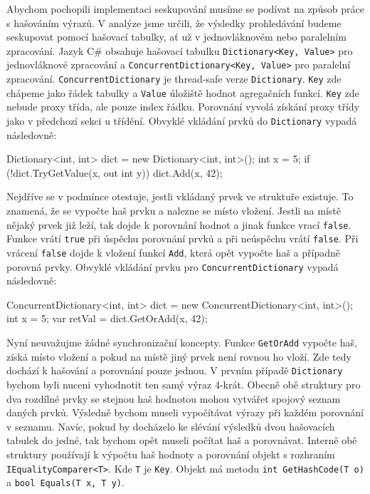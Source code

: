 Abychom pochopili implementaci seskupování musíme se podívat na způsob práce s hašováním výrazů.
V analýze jsme určili, že výsledky prohledávání budeme seskupovat pomocí hašovací tabulky, ať už v jednovláknovém nebo paralelním zpracování.
Jazyk C\# obsahuje hašovací tabulku \texttt{Dictionary<Key, Value>} pro jednovláknové zpracování a \texttt{ConcurrentDictionary<Key, Value>} pro paralelní zpracování.
\texttt{ConcurrentDictionary} je thread-safe verze \texttt{Dictionary}. 
\texttt{Key} zde chápeme jako řádek tabulky a \texttt{Value} úložiště hodnot agregačních funkcí. 
\texttt{Key} zde nebude proxy třída, ale pouze index řádku.
Porovnání vyvolá získání proxy třídy jako v předchozí sekci u třídění.
Obvyklé vkládání prvků do \texttt{Dictionary} vypadá následovně:
\begin{code}
Dictionary<int, int> dict = new Dictionary<int, int>();
int x = 5;
if (!dict.TryGetValue(x, out int y)) dict.Add(x, 42);
\end{code}
Nejdříve se v podmínce otestuje, jestli vkládaný prvek ve struktuře existuje.
To znamená, že se vypočte haš prvku a nalezne se místo vložení.
Jestli na místě nějaký prvek již leží, tak dojde k porovnání hodnot a jinak funkce vrací \texttt{false}.
Funkce vrátí \texttt{true} při úspěchu porovnání prvků a při neúspěchu vrátí \texttt{false}.
Při vrácení \texttt{false} dojde k vložení funkcí \texttt{Add}, která opět vypočte haš a případně porovná prvky.
Obvyklé vkládání prvku pro \texttt{ConcurrentDictionary} vypadá následovně:
\begin{code}
ConcurrentDictionary<int, int> dict = 
    new ConcurrentDictionary<int, int>();
int x = 5;
var retVal = dict.GetOrAdd(x, 42);
\end{code}
Nyní neuvažujme žádné synchronizační koncepty.
Funkce \texttt{GetOrAdd} vypočte haš, získá místo vložení a pokud na místě jiný prvek není rovnou ho vloží.
Zde tedy dochází k hašování a porovnání pouze jednou.
V prvním případě \texttt{Dictionary} bychom byli nuceni vyhodnotit ten samý výraz 4-krát.
Obecně obě struktury pro dva rozdílné prvky se stejnou haš hodnotou mohou vytvářet spojový seznam daných prvků.
Výsledně bychom museli vypočítávat výrazy při každém porovnání v seznamu.
Navíc, pokud by docházelo ke slévání výsledků dvou hašovacích tabulek do jedné, tak bychom opět museli počítat haš a porovnávat.
Interně obě struktury používají k výpočtu haš hodnoty a porovnání objekt s rozhraním \texttt{IEqualityComparer<T>}.
Kde \texttt{T} je \texttt{Key}. 
Objekt má metodu \texttt{int GetHashCode(T o)} a \texttt{bool Equals(T x, T y)}.
